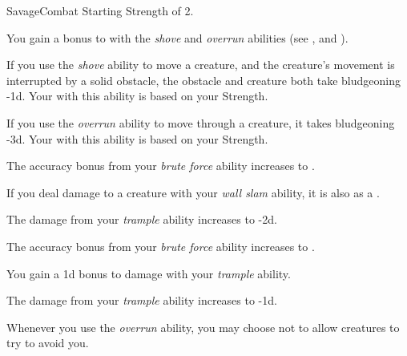     \begin{feat}{Savage}{Combat}
        \featpre Starting Strength of 2.

         You gain a  bonus to  with the \textit{shove} and \textit{overrun} abilities (see , and ).

         If you use the \textit{shove} ability to move a creature, and the creature's movement is interrupted by a solid obstacle, the obstacle and creature both take bludgeoning  -1d.
        Your  with this ability is based on your Strength.

         If you use the \textit{overrun} ability to move through a creature, it takes bludgeoning  -3d.
        Your  with this ability is based on your Strength.

         The accuracy bonus from your \textit{brute force} ability increases to .

         If you deal damage to a creature with your \textit{wall slam} ability, it is also  as a .

         The damage from your \textit{trample} ability increases to  -2d.

         The accuracy bonus from your \textit{brute force} ability increases to .

         You gain a \plus1d bonus to damage with your \textit{trample} ability.

         The damage from your \textit{trample} ability increases to  -1d.

         Whenever you use the \textit{overrun} ability, you may choose not to allow creatures to try to avoid you.
    \end{feat}

